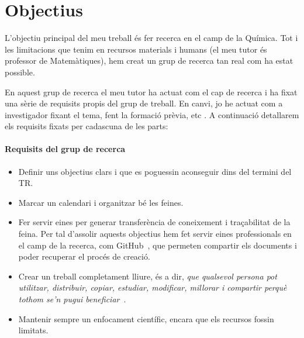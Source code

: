 \chapter{Objectius}
\label{c:objectius}
L'objectiu principal del meu treball és fer recerca en el camp de la Química. Tot i les limitacions que tenim en recursos materials i humans (el meu tutor és professor de Matemàtiques), hem creat un grup de recerca tan real com ha estat possible.

En aquest grup de recerca el meu tutor ha actuat com el cap de recerca i ha fixat una sèrie de requisits propis del grup de treball. En canvi, jo he actuat com a investigador fixant el tema, fent la formació prèvia, etc .
A continuació detallarem els requisits fixats per cadascuna de les parts:

\subsubsection*{Requisits del grup de recerca}
\begin{itemize}
    \item Definir uns objectius clars i que es poguessin aconseguir dins del termini del TR.
    \item Marcar un calendari i organitzar bé les feines.
    \item Fer servir eines per generar transferència de coneixement i traçabilitat de la feina. Per tal d'assolir aquests objectius hem fet servir eines professionals en el camp de la recerca, com GitHub~\cite{GitHub}, que permeten compartir els documents i poder recuperar el procés de creació.
    \item Crear un treball completament lliure, és a dir, \textit{que qualsevol persona pot utilitzar, distribuir, copiar, estudiar, modificar, millorar i compartir perquè tothom se'n pugui beneficiar}~\cite{programariLliure}.
    \item Mantenir sempre un enfocament científic, encara que els recursos fossin limitats.
\end{itemize}

